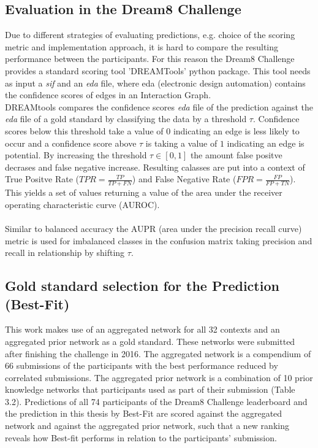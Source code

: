 \subsection*{Evaluation in the Dream8 Challenge}
Due to different strategies of evaluating predictions, e.g. choice of the scoring metric and implementation approach, it is hard to compare the resulting performance between the participants. For this reason the Dream8 Challenge provides a standard scoring tool 'DREAMTools' python package.
This tool needs as input a \textit{sif} and an \textit{eda} file, where eda (electronic design automation) contains the confidence scores of edges in an Interaction Graph.\\
DREAMtools compares the confidence scores \textit{eda} file of the prediction against the \textit{eda} file of a gold standard by classifying the data by a threshold $\tau$. Confidence scores below this threshold take a value of $0$ indicating an edge is less likely to occur and a confidence score above $\tau$ is taking a value of $1$ indicating an edge is potential. By increasing the threshold $\tau\in[0,1]$ the amount false positve decrases and false negative increase. 
Resulting calasses are put into a context of True Positve Rate ($TPR=\frac{TP}{TP+FN}$) and False Negative Rate ($FPR=\frac{FP}{FP+TN}$). This yields a set of values returning a value of the area under the receiver operating characteristic curve (AUROC).\\\\   
Similar to balanced accuracy the AUPR (area under the precision recall curve) metric is used for imbalanced classes in the confusion matrix taking precision and recall in relationship by shifting $\tau$.

\subsection*{Gold standard selection for the Prediction (Best-Fit)}
This work makes use of an aggregated network for all 32 contexts and an aggregated prior network as a gold standard. These networks were submitted after finishing the challenge in 2016. The aggregated network is a compendium of 66 submissions of the participants with the best performance reduced by correlated submissions. The aggregated prior network is a combination of 10 prior knowledge networks that participants used as part of their submission (Table 3.2).
Predictions of all 74 participants of the Dream8 Challenge leaderboard  and the prediction in this thesis by Best-Fit are scored against the aggregated network and against the aggregated prior network, such that a new ranking reveals how Best-fit performs in relation to the participants' submission.

